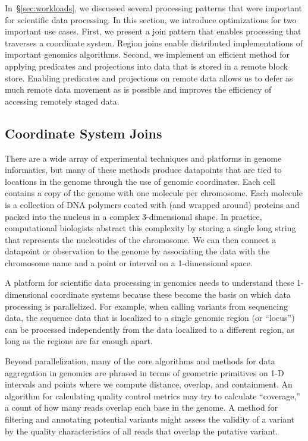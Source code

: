\documentclass{sig-alternate}
\begin{document}
In~\S\ref{sec:workloads}, we discussed several processing patterns that were important for scientific
data processing. In this section, we introduce optimizations for two important use cases. First, we present
a join pattern that enables processing that traverses a coordinate system. Region joins enable distributed
implementations of important genomics algorithms. Second, we implement an efficient method for
applying predicates and projections into data that is stored in a remote block store. Enabling predicates
and projections on remote data allows us to defer as much remote data movement as is possible and
improves the efficiency of accessing remotely staged data.

\subsection{Coordinate System Joins}
\label{sec:coordinate-system-joins}

There are a wide array of experimental techniques and platforms in genome informatics, but many of these
methods produce datapoints that are tied to locations in the genome through the use of genomic coordinates.
Each cell contains a copy of the genome with one molecule per chromosome. Each molecule is a collection of
DNA polymers coated with (and wrapped around) proteins and packed into the nucleus in a complex
3-dimensional shape. In practice, computational biologists abstract this complexity by storing a single long
string that represents the nucleotides of the chromosome. We can then connect a datapoint or observation to the
genome by associating the data with the chromosome name and a point or interval on a 1-dimensional space.

A platform for scientific data processing in genomics needs to understand these 1-dimensional coordinate
systems because these become the basis on which data processing is parallelized. For example, when calling
variants from sequencing data, the sequence data that is localized to a single genomic region (or ``locus'') can be 
processed independently from the data localized to a different region, as long as the regions are far enough
apart.

Beyond parallelization, many of the core algorithms and methods for data aggregation in genomics are phrased
in terms of geometric primitives on 1-D intervals and points where we compute distance, overlap, and
containment.  An algorithm for calculating quality control metrics may try to calculate ``coverage,'' a count
of how many reads overlap each base in the genome. A method for filtering and annotating potential variants
might assess the validity of a variant by the quality characteristics of all reads that overlap the putative variant.
\end{document}
